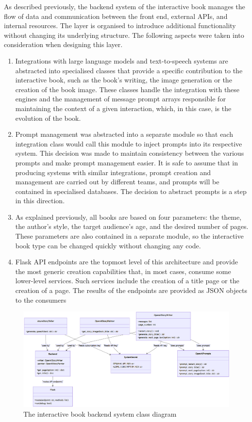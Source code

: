 \documentclass[conference]{IEEEtran}
\begin{document}
	As described previously, the backend system of the interactive book manages the flow of data and communication between the front end, external APIs, and internal resources. The layer is organised to introduce additional functionality without changing its underlying structure. The following aspects were taken into consideration when designing this layer.
		
	\begin{enumerate}
		\item Integrations with large language models and text-to-speech systems are abstracted into specialised classes that provide a specific contribution to the interactive book, such as the book's writing, the image generation or the creation of the book image. These classes handle the integration with these engines and the management of message prompt arrays responsible for maintaining the context of a given interaction, which, in this case, is the evolution of the book.
		\item Prompt management was abstracted into a separate module so that each integration class would call this module to inject prompts into its respective system. This decision was made to maintain consistency between the various prompts and make prompt management easier. It is safe to assume that in producing systems with similar integrations, prompt creation and management are carried out by different teams, and prompts will be contained in specialised databases. The decision to abstract prompts is a step in this direction.
		\item As explained previously, all books are based on four parameters: the theme, the author's style, the target audience's age, and the desired number of pages. These parameters are also contained in a separate module, so the interactive book type can be changed quickly without changing any code.
		\item Flask API endpoints are the topmost level of this architecture and provide the most generic creation capabilities that, in most cases, consume some lower-level services. Such services include the creation of a title page or the creation of a page. The results of the endpoints are provided as JSON objects to the consumers
	\end{enumerate}
	
	\begin{figure}[H]
		\centering
		\includegraphics[width=0.9\linewidth]{img/img-ARI3333-backend-class-diagram}
		\caption{The interactive book backend system class diagram}
		\label{fig:img-ari3333-backend-class-diagram}
	\end{figure}
	
\end{document}
